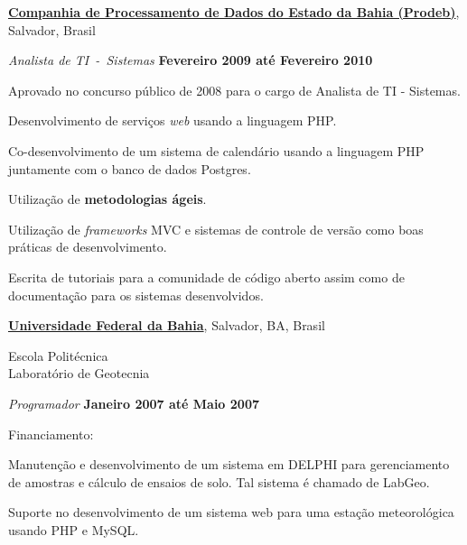 \documentclass[10pt]{article}
\let\oldcite=\cite
\renewcommand{\cite}[1]{\footnotesize{\textbf{\oldcite{#1}}}\normalsize{}}
\newcommand{\halfblankline}{\quad\vspace{-0.5\baselineskip}\pagebreak[3]}
\begin{document}
\halfblankline

\href{http://www.prodeb.ba.gov.br}{\textbf{Companhia de Processamento de Dados do Estado da Bahia (Prodeb)}},
Salvador, Brasil
\begin{outerlist}

\item[] \textit{Analista de TI~-~Sistemas}%
        \hfill \textbf{Fevereiro 2009 até Fevereiro 2010}
\begin{innerlist}
\item Aprovado no concurso público de 2008 para o cargo de Analista de TI - Sistemas.
\item Desenvolvimento de serviços \emph{web} usando a linguagem PHP.
\item Co-desenvolvimento de um sistema de calendário usando a linguagem PHP juntamente com o banco de dados Postgres.
\item Utilização de \textbf{metodologias ágeis}.
\item Utilização de \emph{frameworks} MVC e sistemas de controle de versão como boas práticas de desenvolvimento.
\item Escrita de tutoriais para a comunidade de código aberto assim como de documentação para os sistemas desenvolvidos.
\end{innerlist}
\end{outerlist}

\halfblankline

\href{http://www.geotecnia.ufba.br/}{\textbf{Universidade Federal da Bahia}},
Salvador, BA, Brasil

\begin{innerlist}
  \item[]
    Escola Politécnica\\
    Laboratório de Geotecnia
\end{innerlist}

\begin{outerlist}

\item[] \textit{Programador}%
        \hfill \textbf{Janeiro 2007 até Maio 2007}
\begin{innerlist}
\item Financiamento:~\cite{Grant2007a}
\item Manutenção e desenvolvimento de um sistema em DELPHI para gerenciamento de amostras e cálculo de ensaios de solo. Tal sistema é chamado de LabGeo.
\item Suporte no desenvolvimento de um sistema web para uma estação meteorológica usando PHP e MySQL.
\end{innerlist}

\end{outerlist}
\end{document}

